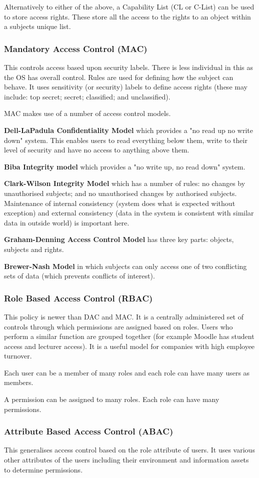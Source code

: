 Alternatively to either of the above, a Capability List (CL or C-List) can be used to store access rights. These store all the access to the rights to an object within a subjects unique list. 

\subsubsection*{Mandatory Access Control (MAC)}
This controls access based upon security labels. There is less individual in this as the OS has overall control. Rules are used for defining how the subject can behave. It uses sensitivity (or security) labels to define access rights (these may include: top secret; secret; classified; and unclassified).

MAC makes use of a number of access control models.

\textbf{Dell-LaPadula Confidentiality Model} which provides a "no read up no write down" system. This enables users to read everything below them, write to their level of security and have no access to anything above them.

\textbf{Biba Integrity model} which provides a "no write up, no read down" system.

\textbf{Clark-Wilson Integrity Model} which has a number of rules: no changes by unauthorised subjects; and no unauthorised changes by authorised subjects. Maintenance of internal consistency (system does what is expected without exception) and external consistency (data in the system is consistent with similar data in outside world) is important here.

\textbf{Graham-Denning Access Control Model} has three key parts: objects, subjects and rights.

\textbf{Brewer-Nash Model} in which subjects can only access one of two conflicting sets of data (which prevents conflicts of interest). 

\subsubsection*{Role Based Access Control (RBAC)}
This policy is newer than DAC and MAC. It is a centrally administered set of controls through which permissions are assigned based on roles. Users who perform a similar function are grouped together (for example Moodle has student access and lecturer access). It is a useful model for companies with high employee turnover. 

Each user can be a member of many roles and each role can have many users as members.

A permission can be assigned to many roles. Each role can have many permissions. 

\subsubsection*{Attribute Based Access Control (ABAC)}
This generalises access control based on the role attribute of users. It uses various other attributes of the users including their environment and information assets to determine permissions. 